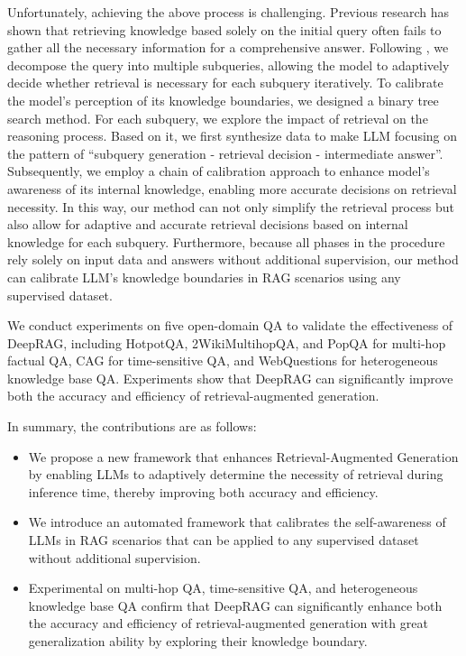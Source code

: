 Unfortunately, achieving the above process is challenging. 
% 
Previous research has shown that retrieving knowledge based solely on the initial query often fails to gather all the necessary information for a comprehensive answer. 
Following \citet{yue2024inference}, we decompose the query into multiple subqueries, allowing the model to adaptively decide whether retrieval is necessary for each subquery iteratively.
To calibrate the model's perception of its knowledge boundaries, we designed a binary tree search method. For each subquery, we explore the impact of retrieval on the reasoning process. 
Based on it, we first synthesize data to make LLM focusing on the pattern of ``subquery generation - retrieval decision - intermediate answer''. 
Subsequently, we employ a chain of calibration approach to enhance model's awareness of its internal knowledge, enabling more accurate decisions on retrieval necessity.
% 
In this way, our method can not only simplify the retrieval process but also allow for adaptive and accurate retrieval decisions based on internal knowledge for each subquery. 
% 
Furthermore, because all phases in the procedure rely solely on input data and answers without additional supervision, our method can calibrate LLM's knowledge boundaries in RAG scenarios using any supervised dataset. 


We conduct experiments on five open-domain QA to validate the effectiveness of DeepRAG, including HotpotQA, 2WikiMultihopQA, and PopQA for multi-hop factual QA, CAG for time-sensitive QA, and WebQuestions for heterogeneous knowledge base QA.
% 
Experiments show that DeepRAG can significantly improve both the accuracy and efficiency of retrieval-augmented generation.

In summary, the contributions are as follows:



\begin{itemize}
    \item We propose a new framework that enhances Retrieval-Augmented Generation by enabling LLMs to adaptively determine the necessity of retrieval during inference time, thereby improving both accuracy and efficiency.
    \item We introduce an automated framework that calibrates the self-awareness of LLMs in RAG scenarios that can be applied to any supervised dataset without additional supervision.
    \item Experimental on multi-hop QA, time-sensitive QA, and heterogeneous knowledge base QA confirm that DeepRAG can significantly enhance both the accuracy and efficiency of retrieval-augmented generation with great generalization ability by exploring their knowledge boundary.
\end{itemize}


